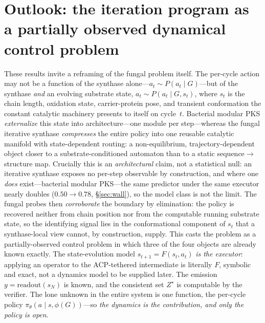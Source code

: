 \documentclass[11pt]{article}
\theoremstyle{definition}
\newcommand{\zstar}{\ensuremath{Z^{\star}}}
\begin{document}
\section{Outlook: the iteration program as a partially observed dynamical control problem}
\label{sec:pomdp}
These results invite a reframing of the fungal problem itself. The per-cycle action may not be a function
of the synthase alone---$a_t\sim P(a_t\mid G)$---but of the synthase \emph{and} an evolving substrate
state, $a_t\sim P(a_t\mid G,s_t)$, where $s_t$ is the chain length, oxidation state, carrier-protein pose,
and transient conformation the constant catalytic machinery presents to itself on cycle~$t$. Bacterial
modular PKS \emph{externalize} this state into architecture---one module per step---whereas the fungal
iterative synthase \emph{compresses} the entire policy into one reusable catalytic manifold with
state-dependent routing: a non-equilibrium, trajectory-dependent object closer to a substrate-conditioned
automaton than to a static sequence$\to$structure map. Crucially this is an
\emph{architectural} claim, not a statistical null: an iterative synthase exposes no per-step observable
by construction, and where one \emph{does} exist---bacterial modular PKS---the same predictor under the
same executor nearly doubles ($0.50\!\to\!0.78$, \S\ref{sec:wall}), so the model class is not the limit.
The fungal probes then \emph{corroborate} the boundary by elimination: the policy is recovered neither
from chain position nor from the computable running substrate state, so the identifying signal lies in
the conformational component of $s_t$ that a synthase-local view cannot, by construction, supply. This casts the problem as a partially-observed control problem in which three of the four objects are
already known exactly. The state-evolution model $s_{t+1}=F(s_t,a_t)$ \emph{is the executor}: applying
an operator to the ACP-tethered intermediate is literally $F$, symbolic and exact, not a dynamics model
to be supplied later. The emission $y=\mathrm{readout}(s_N)$ is known, and the consistent set \zstar{}
is computable by the verifier. The lone unknown in the entire system is one function, the per-cycle
policy $\pi_\theta(a\mid s,\phi(G))$---so \emph{the dynamics is the contribution, and only the policy is
open}.
\end{document}
